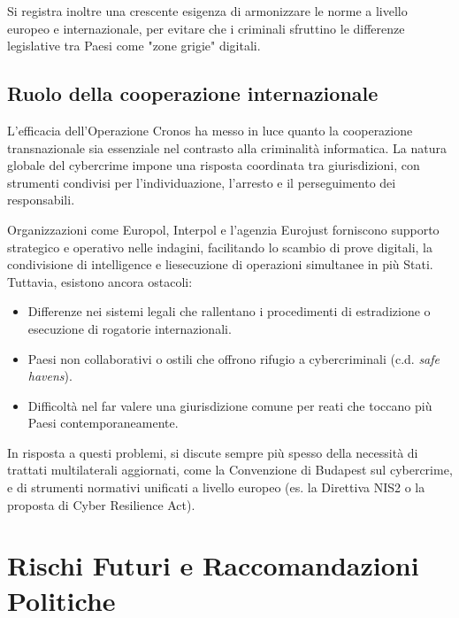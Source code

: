 \documentclass[a4paper,12pt,twoside]{article}
\begin{document}
Si registra inoltre una crescente esigenza di armonizzare le norme a livello europeo e internazionale, per evitare che i criminali sfruttino le differenze legislative tra Paesi come "zone grigie" digitali.

\subsection{Ruolo della cooperazione internazionale}
L'efficacia dell'Operazione Cronos ha messo in luce quanto la cooperazione transnazionale sia essenziale nel contrasto alla criminalità informatica. La natura globale del cybercrime impone una risposta coordinata tra giurisdizioni, con strumenti condivisi per l'individuazione, l'arresto e il perseguimento dei responsabili.

Organizzazioni come Europol, Interpol e l'agenzia Eurojust forniscono supporto strategico e operativo nelle indagini, facilitando lo scambio di prove digitali, la condivisione di intelligence e liesecuzione di operazioni simultanee in più Stati. Tuttavia, esistono ancora ostacoli:

\begin{itemize}
    \item Differenze nei sistemi legali che rallentano i procedimenti di estradizione o esecuzione di rogatorie internazionali.
    \item Paesi non collaborativi o ostili che offrono rifugio a cybercriminali (c.d. \textit{safe havens}).
    \item Difficoltà nel far valere una giurisdizione comune per reati che toccano più Paesi contemporaneamente.
\end{itemize}

In risposta a questi problemi, si discute sempre più spesso della necessità di trattati multilaterali aggiornati, come la Convenzione di Budapest sul cybercrime, e di strumenti normativi unificati a livello europeo (es. la Direttiva NIS2 o la proposta di Cyber Resilience Act).

\newpage
\section{Rischi Futuri e Raccomandazioni Politiche}
\end{document}
